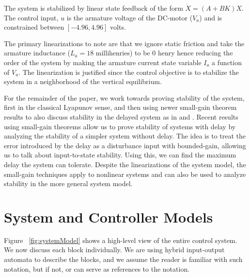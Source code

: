 \documentclass[conference]{IEEEtran}
\begin{document}
The system is stabilized by linear state feedback of the form $\dot{X}=\left(A+BK\right)X$.  The control input, $u$ is the armature voltage of the DC-motor ($V_a$) and is constrained between $\left[-4.96,4.96\right]$ volts.

The primary linearizations to note are that we ignore static friction and take the armature inductance ($L_a=18$ millihenries) to be $0$ henry hence reducing the order of the system by making the armature current state variable $I_a$ a function of $V_a$.  The linearization is justified since the control objective is to stabilize the system in a neighborhood of the vertical equilibrium.  

For the remainder of the paper, we work towards proving stability of the system, first in the classical Lyapunov sense, and then using newer small-gain theorem results to also discuss stability in the delayed system as in \cite{LiberzonQuantDelay2006} and \cite{SanfeliceTeel2005}.  Recent results using small-gain theorems allow us to prove stability of systems with delay by analyzing the stability of a simpler system without delay.  The idea is to treat the error introduced by the delay as a disturbance input with bounded-gain, allowing us to talk about input-to-state stability.  Using this, we can find the maximum delay the system can tolerate.  Despite the linearizations of the system model, the small-gain techniques apply to nonlinear systems and can also be used to analyze stability in the more general system model.

\section{System and Controller Models}

Figure ~\ref{fig:systemModel} shows a high-level view of the entire control system.  We now discuss each block individually.  We are using hybrid input-output automata to describe the blocks, and we assume the reader is familiar with such notation, but if not, \cite{lynchSV2003} or \cite{MitraPhd2007} can serve as references to the notation.
\end{document}
